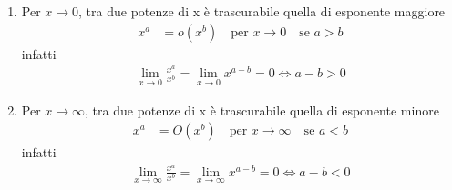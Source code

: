 \documentclass{book}
\begin{document}
\begin{enumerate}[label=\roman*., start=1]
    \item Per \(x \to 0\), tra due potenze di x è trascurabile quella di esponente maggiore
          \begin{align*}
              x^a & = o(x^b) \quad \text{per } x \to 0 \quad \text{se } a > b
          \end{align*}
          infatti
          \begin{align*}
              \lim_{x \to 0} \frac{x^a}{x^b} = \lim_{x \to 0} x^{a-b} = 0 \iff a-b>0
          \end{align*}

    \item Per \(x \to \infty\), tra due potenze di x è trascurabile quella di esponente minore
          \begin{align*}
              x^a & = O(x^b) \quad \text{per } x \to \infty \quad \text{se } a < b
          \end{align*}
          infatti
          \begin{align*}
              \lim_{x \to \infty} \frac{x^a}{x^b} = \lim_{x \to \infty} x^{a-b} = 0 \iff a-b<0
          \end{align*}
\end{enumerate}
\end{document}
